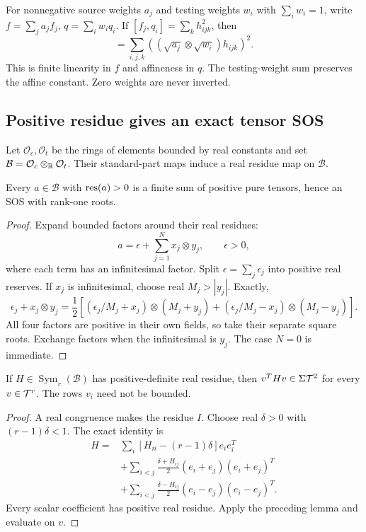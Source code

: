 For nonnegative source weights \(a_j\) and testing weights \(w_i\)
with \(\sum_iw_i=1\), write \(f=\sum_ja_jf_j\), \(q=\sum_iw_iq_i\).
If \([f_j,q_i]=\sum_k h_{ijk}^2\), then
\begin{equation}
 [f,q]=\sum_{i,j,k}
 \left((\sqrt{a_j}\otimes\sqrt{w_i})h_{ijk}\right)^2.
 \label{eq:mixture}
\end{equation}
This is finite linearity in \(f\) and affineness in \(q\).
The testing-weight sum preserves the affine constant. Zero weights
are never inverted. 

\subsection{Positive residue gives an exact tensor SOS}

Let \(\mathcal O_c,\mathcal O_t\) be the rings of elements bounded by
real constants and set \(\mathcal B=\mathcal O_c\otimes_\mathbb R\mathcal O_t\).
Their standard-part maps induce a real residue map on \(\mathcal B\).

\begin{lemma}
Every \(a\in\mathcal B\) with \(\operatorname{res}(a)>0\) is a finite sum of
positive pure tensors, hence an SOS with rank-one roots.
\end{lemma}

\begin{proof}
Expand bounded factors around their real residues:
\[
 a=\epsilon+\sum_{j=1}^{N}x_j\otimes y_j,\qquad\epsilon>0,
\]
where each term has an infinitesimal factor. Split
\(\epsilon=\sum_j\epsilon_j\) into positive real reserves.
If \(x_j\) is infinitesimal, choose real \(M_j>|y_j|\). Exactly,
\[
 \epsilon_j+x_j\otimes y_j
 =\frac12\left[
 (\epsilon_j/M_j+x_j)\otimes(M_j+y_j)
 +(\epsilon_j/M_j-x_j)\otimes(M_j-y_j)\right].
\]
All four factors are positive in their own fields, so take their
separate square roots. Exchange factors when the infinitesimal is
\(y_j\). The case \(N=0\) is immediate.
\end{proof}

\begin{lemma}
If \(H\in\operatorname{Sym}_r(\mathcal B)\) has positive-definite real
residue, then \(v^THv\in\Sigma\mathcal T^2\) for every \(v\in\mathcal T^r\).
The rows \(v_i\) need not be bounded.
\end{lemma}

\begin{proof}
A real congruence makes the residue \(I\). Choose real \(\delta>0\)
with \((r-1)\delta<1\). The exact identity is
\[
\begin{aligned}
 H={}&\sum_i[H_{ii}-(r-1)\delta]e_ie_i^T\\
 &+\sum_{i<j}\frac{\delta+H_{ij}}2(e_i+e_j)(e_i+e_j)^T\\
 &+\sum_{i<j}\frac{\delta-H_{ij}}2(e_i-e_j)(e_i-e_j)^T.
\end{aligned}
\]
Every scalar coefficient has positive real residue. Apply the preceding
lemma and evaluate on \(v\).
\end{proof}

